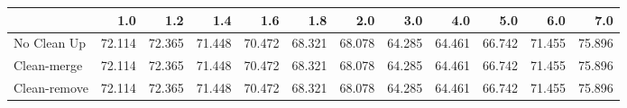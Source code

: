 \begin{tabular}{lrrrrrrrrrrr}
\toprule
{} &    1.0 &    1.2 &    1.4 &    1.6 &    1.8 &    2.0 &    3.0 &    4.0 &    5.0 &    6.0 &    7.0 \\
\midrule
No Clean Up  & 72.114 & 72.365 & 71.448 & 70.472 & 68.321 & 68.078 & 64.285 & 64.461 & 66.742 & 71.455 & 75.896 \\
Clean-merge  & 72.114 & 72.365 & 71.448 & 70.472 & 68.321 & 68.078 & 64.285 & 64.461 & 66.742 & 71.455 & 75.896 \\
Clean-remove & 72.114 & 72.365 & 71.448 & 70.472 & 68.321 & 68.078 & 64.285 & 64.461 & 66.742 & 71.455 & 75.896 \\
\bottomrule
\end{tabular}

